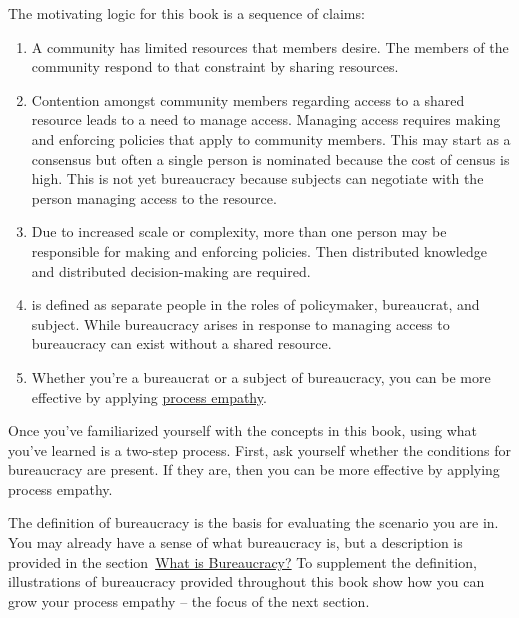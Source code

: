 The motivating logic for this book is a sequence of claims:
\begin{enumerate}
    \item A community has limited resources that members desire. The members of the community respond to that constraint by sharing resources.
    \item Contention amongst community members regarding access to a \gls{shared resource} leads to a need to manage access.  
    \iftoggle{glossaryinmargin}{\marginpar{[Glossary]}}{}%
    Managing access requires making and enforcing policies that apply to community members. This may start as a consensus but often a single person is nominated because the cost of census is high. This is not yet bureaucracy because subjects can negotiate with the person managing access to the resource.
    \item Due to increased scale or complexity, more than one person may be responsible for making and enforcing policies. Then distributed knowledge and distributed decision-making are required.
    \item 
\iftoggle{glossarysubstitutionworks}{\Gls{bureaucracy}}{Bureaucracy}%
\iftoggle{glossaryinmargin}{\marginpar{[Glossary]}}{} is defined as separate people in the roles of policymaker, bureaucrat, and subject. While bureaucracy arises in response to managing access to 
\iftoggle{glossarysubstitutionworks}{\glspl{shared resource},}{shared resources,} bureaucracy can exist without a shared resource.
    \item Whether you're a \gls{bureaucrat} 
    \iftoggle{glossaryinmargin}{\marginpar{[Glossary]}}{}%
    or a subject of bureaucracy, you can be more effective by applying \hyperref[sec:process-empathy]{process empathy}.
\end{enumerate}

Once you've familiarized yourself with the concepts in this book, using what you've learned is a two-step process. First, ask yourself whether the conditions for bureaucracy are present. If they are, then you can be more effective by applying process empathy.

The definition of bureaucracy is the basis for evaluating the scenario you are in. You may already have a sense of what bureaucracy is, but a description is provided %
\iftoggle{haspagenumbers}{ on page~\pageref{sec:define-bureaucracy}}{} 
in the section~\hyperref[sec:define-bureaucracy]{What is Bureaucracy?} To supplement the definition, illustrations of bureaucracy provided throughout this book show how you can grow your process empathy -- the focus of the next section. 